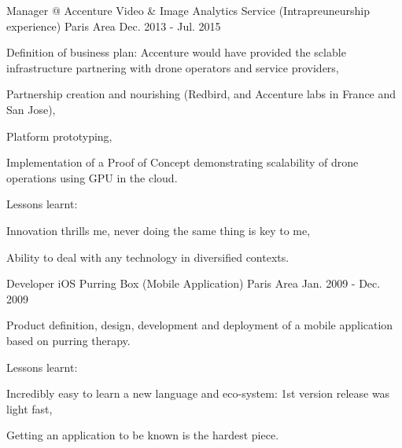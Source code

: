 

\begin{cventries}

  \cventry
    {Manager @ Accenture} %
    {Video \& Image Analytics Service (Intrapreuneurship experience)} %
    {Paris Area} %
    {Dec. 2013 - Jul. 2015} %
    {
      \begin{cvitems} %
        \item {Definition of business plan: Accenture would have provided the sclable infrastructure partnering with drone operators and service providers,}
        \item {Partnership creation and nourishing (Redbird, and Accenture labs in France and San Jose),}
        \item {Platform prototyping,}
        \item {Implementation of a Proof of Concept demonstrating scalability of drone operations using GPU in the cloud.}
        \item {Lessons learnt:}
        \begin{cvsubitems}
          \item {Innovation thrills me, never doing the same thing is key to me,}
          \item {Ability to deal with any technology in diversified contexts.}
        \end{cvsubitems}
      \end{cvitems}
    }

  \cventry
    {Developer iOS} %
    {Purring Box (Mobile Application)} %
    {Paris Area} %
    {Jan. 2009 - Dec. 2009} %
    {
      \begin{cvitems} %
        \item {Product definition, design, development and deployment of a mobile application based on purring therapy.}
        \item {Lessons learnt:}
        \begin{cvsubitems}
          \item {Incredibly easy to learn a new language and eco-system: 1st version release was light fast,}
          \item {Getting an application to be known is the hardest piece.}
        \end{cvsubitems}
      \end{cvitems}
    }


\end{cventries}
